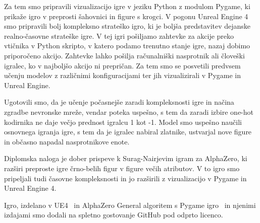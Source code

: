 \documentclass[a4paper, 12pt]{book}
\begin{document}
Za tem smo pripravili vizualizacijo igre v jeziku Python z modulom Pygame, ki prikaže igro v preprosti šahovnici in figure s krogci.
V pogonu Unreal Engine 4 smo pripravili bolj kompleksno strateško igro, ki je boljša predstavitev dejanske realno-časovne strateške igre.
V tej igri pošiljamo zahtevke za akcije preko vtičnika v Python skripto, v katero podamo trenutno stanje igre, nazaj dobimo priporočeno akcijo.
Zahtevke lahko pošilja računalniški nasprotnik ali človeški igralec, ko v najboljšo akcijo ni prepričan.
Za tem smo se posvetili predvsem učenju modelov z različnimi konfiguracijami ter jih vizualizirali v Pygame in Unreal Engine.

Ugotovili smo, da je učenje počasnejše zaradi kompleksnosti igre in načina zgradbe nevronske mreže, vendar poteka uspešno, s tem da zaradi izbire one-hot kodirnika ne daje večjo prednost igralcu 1 kot -1.
Model smo uspešno naučili osnovnega igranja igre, s tem da je igralec nabiral zlatnike, ustvarjal nove figure in občasno napadal nasprotnikove enote.

Diplomska naloga je dober prispeve k Surag-Nairjevim igram za AlphaZero, ki razširi preproste igre črno-belih figur v figure večih atributov.
V to igro smo pripeljali tudi časovne kompleksnosti in jo razširili z vizualizacijo v Pygame in Unreal Engine 4.

Igro, izdelano v UE4~\cite{td2020} in AlphaZero General algoritem s Pygame igro~\cite{pygameAlphaZeroGeneral} in njenimi izdajami smo dodali na spletno gostovanje GitHub pod odprto licenco.

\newpage %
\ \\
\clearpage
{}


\end{document}
